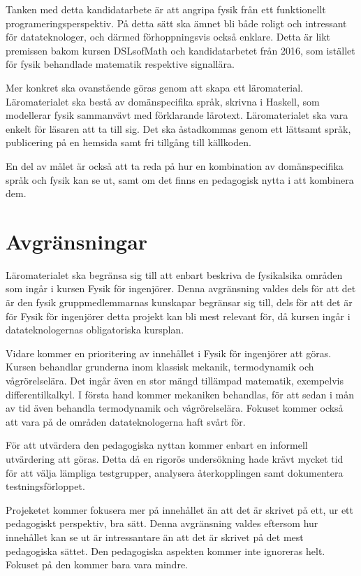 \begin{draft}

Tanken med detta kandidatarbete är att angripa fysik från ett funktionellt programeringsperspektiv. På detta sätt ska ämnet bli både roligt och intressant för datateknologer, och därmed förhoppningsvis också enklare. Detta är likt premissen bakom kursen DSLsofMath och kandidatarbetet från 2016, som istället för fysik behandlade matematik respektive signallära.

Mer konkret ska ovanstående göras genom att skapa ett läromaterial. Läromaterialet ska bestå av domänspecifika språk, skrivna i Haskell, som modellerar fysik sammanvävt med förklarande lärotext. Läromaterialet ska vara enkelt för läsaren att ta till sig. Det ska åstadkommas genom ett lättsamt språk, publicering på en hemsida samt fri tillgång till källkoden.

En del av målet är också att ta reda på hur en kombination av domänspecifika språk och fysik kan se ut, samt om det finns en pedagogisk nytta i att kombinera dem.

\end{draft}

\section{Avgränsningar}

\begin{draft}

Läromaterialet ska begränsa sig till att enbart beskriva de fysikalsika områden som ingår i kursen Fysik för ingenjörer. Denna avgränsning valdes dels för att det är den fysik gruppmedlemmarnas kunskapar begränsar sig till, dels för att det är för Fysik för ingenjörer detta projekt kan bli mest relevant för, då kursen ingår i datateknologernas obligatoriska kursplan.

Vidare kommer en prioritering av innehållet i Fysik för ingenjörer att göras. Kursen behandlar grunderna inom klassisk mekanik, termodynamik och vågrörelselära. Det ingår även en stor mängd tillämpad matematik, exempelvis differentilkalkyl. I första hand kommer mekaniken behandlas, för att sedan i mån av tid även behandla termodynamik och vågrörelselära. Fokuset kommer också att vara på de områden datateknologerna haft svårt för.

För att utvärdera den pedagogiska nyttan kommer enbart en informell utvärdering att göras. Detta då en rigorös undersökning hade krävt mycket tid för att välja lämpliga testgrupper, analysera återkopplingen samt dokumentera testningsförloppet.

Projeketet kommer fokusera mer på innehållet än att det är skrivet på ett, ur ett pedagogiskt perspektiv, bra sätt. Denna avgränsning valdes eftersom hur innehållet kan se ut är intressantare än att det är skrivet på det mest pedagogiska sättet. Den pedagogiska aspekten kommer inte ignoreras helt. Fokuset på den kommer bara vara mindre.

\end{draft}



